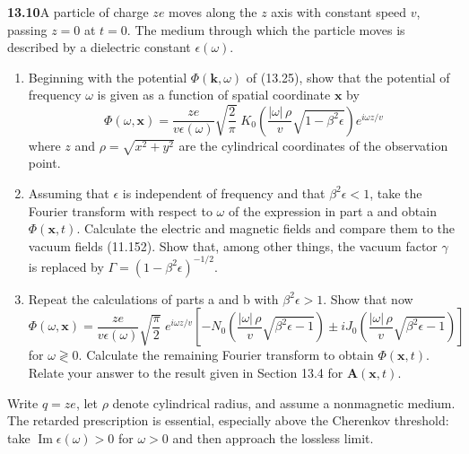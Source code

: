 \par\bigskip
\noindent\textbf{13.10}\quad A particle of charge $ze$ moves along the $z$ axis with constant speed $v$, passing $z=0$ at $t=0$. The medium through which the particle moves is described by a dielectric constant $\epsilon(\omega)$.
\begin{enumerate}
\item[(a)] Beginning with the potential $\Phi(\mathbf{k},\omega)$ of (13.25), show that the potential of frequency $\omega$ is given as a function of spatial coordinate $\mathbf{x}$ by
\[
\Phi(\omega,\mathbf{x})=\frac{ze}{v\epsilon(\omega)}\sqrt{\frac{2}{\pi}}\;K_{0}\!\left(\frac{|\omega|\,\rho}{v}\sqrt{1-\beta^{2}\epsilon}\right)\!e^{i\omega z/v}
\]
where $z$ and $\rho=\sqrt{x^{2}+y^{2}}$ are the cylindrical coordinates of the observation point.
\item[(b)] Assuming that $\epsilon$ is independent of frequency and that $\beta^{2}\epsilon<1$, take the Fourier transform with respect to $\omega$ of the expression in part a and obtain $\Phi(\mathbf{x},t)$. Calculate the electric and magnetic fields and compare them to the vacuum fields (11.152). Show that, among other things, the vacuum factor $\gamma$ is replaced by $\Gamma=(1-\beta^{2}\epsilon)^{-1/2}$.
\item[(c)] Repeat the calculations of parts a and b with $\beta^{2}\epsilon>1$. Show that now
\[
\Phi(\omega,\mathbf{x})=\frac{ze}{v\epsilon(\omega)}\sqrt{\frac{\pi}{2}}\;e^{i\omega z/v}\!\left[-N_{0}\!\left(\frac{|\omega|\,\rho}{v}\sqrt{\beta^{2}\epsilon-1}\right)\pm iJ_{0}\!\left(\frac{|\omega|\,\rho}{v}\sqrt{\beta^{2}\epsilon-1}\right)\right]
\]
for $\omega\gtrless0$. Calculate the remaining Fourier transform to obtain $\Phi(\mathbf{x},t)$. Relate your answer to the result given in Section 13.4 for $\mathbf{A}(\mathbf{x},t)$.
\end{enumerate}
\solution
Write $q=ze$, let $\rho$ denote cylindrical radius, and assume a
nonmagnetic medium. The retarded prescription is essential, especially
above the Cherenkov threshold: take
$\operatorname{Im}\epsilon(\omega)>0$ for $\omega>0$ and then approach
the lossless limit.

